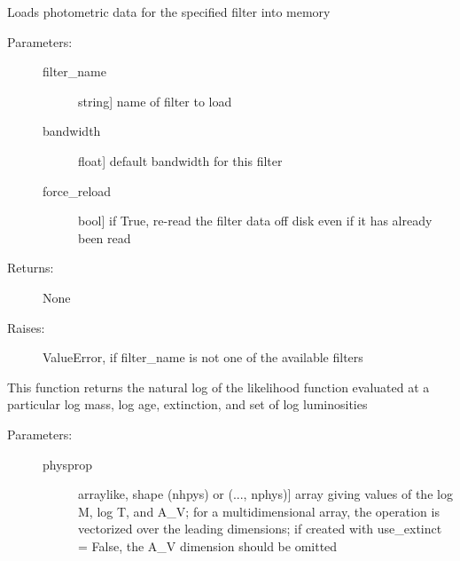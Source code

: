 \documentclass[letterpaper,10pt,english]{sphinxmanual}
\begin{document}
\begin{fulllineitems}
\begin{fulllineitems}
\label{cluster_slug:slugpy.cluster_slug.cluster_slug.load_data}
Loads photometric data for the specified filter into memory
\begin{description}
\item[{Parameters:}] \leavevmode\begin{description}
\item[{filter\_name}] \leavevmode{[}string{]}
name of filter to load

\item[{bandwidth}] \leavevmode{[}float{]}
default bandwidth for this filter

\item[{force\_reload}] \leavevmode{[}bool{]}
if True, re-read the filter data off disk even if it has
already been read

\end{description}

\item[{Returns:}] \leavevmode
None

\item[{Raises:}] \leavevmode
ValueError, if filter\_name is not one of the available
filters

\end{description}

\end{fulllineitems}


\begin{fulllineitems}
\label{cluster_slug:slugpy.cluster_slug.cluster_slug.logL}
This function returns the natural log of the likelihood
function evaluated at a particular log mass, log age,
extinction, and set of log luminosities
\begin{description}
\item[{Parameters:}] \leavevmode\begin{description}
\item[{physprop}] \leavevmode{[}arraylike, shape (nhpys) or (..., nphys){]}
array giving values of the log M, log T, and A\_V; for a
multidimensional array, the operation is vectorized over
the leading dimensions; if created with use\_extinct =
False, the A\_V dimension should be omitted


\end{description}
\end{description}
\end{fulllineitems}
\end{fulllineitems}
\end{document}
